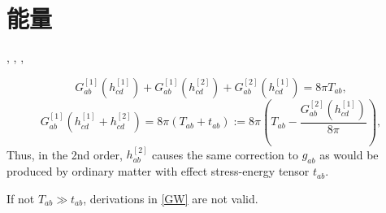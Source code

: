 \chapter{能量}

\cite{Wald1984}, \cite{Maggiore2014}, \cite{Roy2020},

\begin{equation}
    G_{ab}^{[1]}(h_{cd}^{[1]})+G_{ab}^{[1]}(h_{cd}^{[2]})+G_{ab}^{[2]}(h_{cd}^{[1]})=8\pi T_{ab},
\end{equation}
\begin{equation}
    G_{ab}^{[1]}(h_{cd}^{[1]}+h_{cd}^{[2]})=8\pi (T_{ab}+t_{ab}):=8\pi (T_{ab}-\frac{G_{ab}^{[2]}(h_{cd}^{[1]})}{8\pi}),
\end{equation}
Thus, in the 2nd order, $h_{ab}^{[2]}$ causes the same correction to $g_{ab}$ as would be produced by ordinary matter with effect stress-energy tensor $t_{ab}$.

If not $T_{ab}\gg t_{ab}$, derivations in \ref{GW} are not valid.
